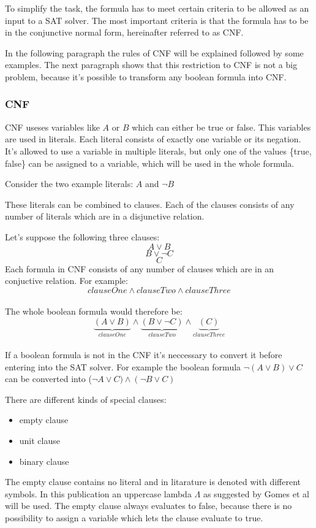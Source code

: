 To simplify the task, the formula has to meet certain criteria to be allowed as an input to a SAT solver. The most important criteria is that the formula has to be in the conjunctive normal form, hereinafter referred to as CNF. 

In the following paragraph the rules of CNF will be explained followed by some examples. The next paragraph shows that this restriction to CNF is not a big problem, because it's possible to transform any boolean formula into CNF\cite{Jackson:2004:CFC:2103144.2103160}.
\subsubsection{CNF}
CNF useses variables like $A$ or $B$ which can either be true or false.
This variables are used in literals. Each literal consists of exactly one variable or its negation. It's allowed to use a variable in multiple literals, but only one of the values \{true, false\} can be assigned to a variable, which will be used in the whole formula.

Consider the two example literals: $A$ and $\lnot B$

These literals can be combined to clauses. Each of the clauses consists of any number of literals which are in a disjunctive relation. 

Let's suppose the following three clauses: 
$$A \lor B$$
$$B \lor \lnot C$$ 
$$C$$
Each formula in CNF consists of any number of clauses which are in an conjuctive relation. For example: $$clauseOne \land clauseTwo \land clauseThree$$\\
The whole boolean formula would therefore be: $$\underbrace{(A \lor B)}_{clauseOne} \land \underbrace{(B \lor \lnot C)}_{clauseTwo} \land \underbrace{(C)}_{clauseThree}$$\\

If a boolean formula is not in the CNF it's neccessary to convert it before entering into the SAT solver. For example the boolean formula $\lnot(A \lor B) \lor C$ can be converted into ($\lnot A \lor C) \land (\lnot B \lor C)$

There are different kinds of special clauses:
\begin{itemize}
\item empty clause
\item unit clause
\item binary clause
\end{itemize}
The empty clause contains no literal and in litarature is denoted with different symbols. In this publication an uppercase lambda $\Lambda$  as suggested by Gomes et al \cite{Gomes2008SatisfiabilityS} will be used.
The empty clause always evaluates to false, because there is no possibility to assign a variable which lets the clause evaluate to true.

